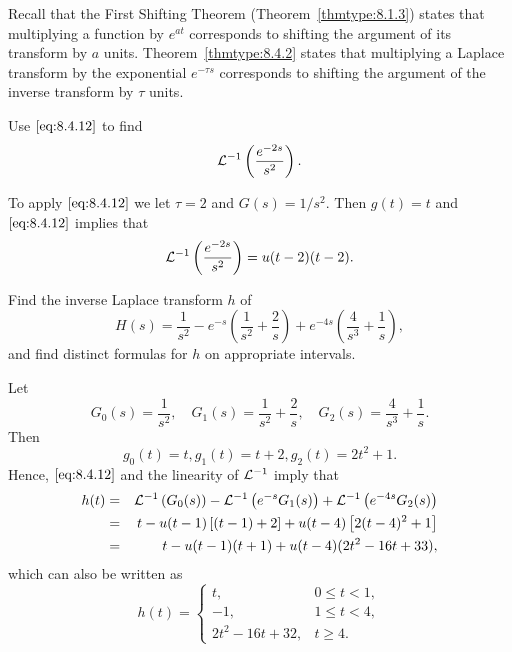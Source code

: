\documentclass{ximera}
\begin{document}
\begin{remark}
Recall that the First Shifting Theorem
(Theorem~\ref{thmtype:8.1.3}) states that multiplying a function  by
$e^{at}$ corresponds to shifting the argument of its transform by $a$
units. Theorem~\ref{thmtype:8.4.2} states that multiplying a Laplace
transform by the exponential $e^{-\tau s}$ corresponds to shifting the
argument of the inverse transform by $\tau$ units.
\end{remark}

\begin{example}\label{example:8.4.6}
 Use $\eqref{eq:8.4.12}$ to find
$$
{\cal L}^{-1}\left(\frac{e^{-2s}}{s^2}\right).
$$
\begin{explanation}
To apply $\eqref{eq:8.4.12}$ we let
$\tau=2$ and $G(s)=1/s^2$. Then $g(t)=t$ and $\eqref{eq:8.4.12}$ implies that
$$
{\cal L}^{-1}\left(\frac{e^{-2s}}{s^2}\right)=u(t-2)(t-2).
$$
\end{explanation}
\end{example}

\begin{example}\label{example:8.4.7}
 Find the inverse Laplace transform $h$ of
$$
H(s)=\frac{1}{s^2}-e^{-s}\left(\frac{1}{s^2}+\frac{2}{s}\right)+
e^{-4s}\left(\frac{4}{s^3}+\frac{1}{s}\right),
$$
and find distinct formulas for $h$ on appropriate intervals.
\begin{explanation}
Let
$$
G_0(s)=\frac{1}{s^2},\quad G_1(s)=\frac{1}{s^2}+\frac{2}{s},\quad
G_2(s)=\frac{4}{s^3}+\frac{1}{ s}.
$$
Then
$$
g_0(t)=t, g_1(t)=t+2, g_2(t)=2t^2+1.
$$
Hence, $\eqref{eq:8.4.12}$ and the linearity of ${\cal L}^{-1}$ imply that
\begin{eqnarray*}
h(t)&=&{\cal L}^{-1}\left(G_0(s)\right)-{\cal
L}^{-1}\left(e^{-s}G_1(s)\right)+{\cal
L}^{-1}\left(e^{-4s}G_2(s)\right)\\
&=&t-u(t-1)\left[(t-1)+2\right]+u(t-4)\left[2(t-4)^2+1\right]\\
&=&t-u(t-1)(t+1)+u(t-4)(2t^2-16t+33),
\end{eqnarray*}
which can also be written as
$$
h(t)=\left\{\begin{array}{cl}
 t,&0\leq t<1,\\
-1,&1\leq t<4,\\
2t^2-16t+32,&t\geq 4.
\end{array}\right.
$$
\end{explanation}
\end{example}
\end{document}

